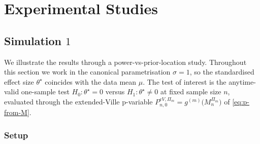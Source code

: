 \documentclass{article}%
\newcommand{\R}{\mathbb{R}}
\newcommand{\dd}{\,\mathrm{d}}
\begin{document}

    




\section{Experimental Studies}
\subsection{Simulation $1$}
We illustrate the results through a power-vs-prior-location study. Throughout this section we work in the
canonical parametrisation \(\sigma=1\), so the standardised effect
size \(\theta^\star\) coincides with the data mean \(\mu\). The test
of interest is the anytime-valid one-sample test
\(H_0:\theta^\star=0\) versus \(H_1:\theta^\star\neq 0\) at fixed
sample size \(n\), evaluated through the extended-Ville p-variable
\(P_{n,0}^{eV,\Pi_m}=g^{(m)}\bigl(M_n^{\Pi_m}\bigr)\) of
\eqref{eq:p-from-M}.


\subsubsection{Setup}\label{ssec:exp-setup}
\end{document}
